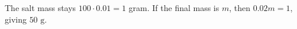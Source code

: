 The salt mass stays $100\cdot0.01=1$ gram. If the final mass is $m$, then $0.02m=1$, giving $\boxed{50\text{ g}}$.
